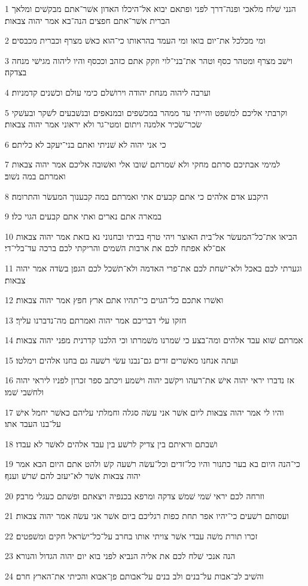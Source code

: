 \par 1 הנני שׁלח מלאכי ופנה־דרך לפני ופתאם יבוא אל־היכלו האדון אשׁר־אתם מבקשׁים ומלאך הברית אשׁר־אתם חפצים הנה־בא אמר יהוה צבאות׃
\par 2 ומי מכלכל את־יום בואו ומי העמד בהראותו כי־הוא כאשׁ מצרף וכברית מכבסים׃
\par 3 וישׁב מצרף ומטהר כסף וטהר את־בני־לוי וזקק אתם כזהב וככסף והיו ליהוה מגישׁי מנחה בצדקה׃
\par 4 וערבה ליהוה מנחת יהודה וירושׁלם כימי עולם וכשׁנים קדמניות׃
\par 5 וקרבתי אליכם למשׁפט והייתי עד ממהר במכשׁפים ובמנאפים ובנשׁבעים לשׁקר ובעשׁקי שׂכר־שׂכיר אלמנה ויתום ומטי־גר ולא יראוני אמר יהוה צבאות׃
\par 6 כי אני יהוה לא שׁניתי ואתם בני־יעקב לא כליתם׃
\par 7 למימי אבתיכם סרתם מחקי ולא שׁמרתם שׁובו אלי ואשׁובה אליכם אמר יהוה צבאות ואמרתם במה נשׁוב׃
\par 8 היקבע אדם אלהים כי אתם קבעים אתי ואמרתם במה קבענוך המעשׂר והתרומה׃
\par 9 במארה אתם נארים ואתי אתם קבעים הגוי כלו׃
\par 10 הביאו את־כל־המעשׂר אל־בית האוצר ויהי טרף בביתי ובחנוני נא בזאת אמר יהוה צבאות אם־לא אפתח לכם את ארבות השׁמים והריקתי לכם ברכה עד־בלי־די׃
\par 11 וגערתי לכם באכל ולא־ישׁחת לכם את־פרי האדמה ולא־תשׁכל לכם הגפן בשׂדה אמר יהוה צבאות׃
\par 12 ואשׁרו אתכם כל־הגוים כי־תהיו אתם ארץ חפץ אמר יהוה צבאות׃
\par 13 חזקו עלי דבריכם אמר יהוה ואמרתם מה־נדברנו עליך׃
\par 14 אמרתם שׁוא עבד אלהים ומה־בצע כי שׁמרנו משׁמרתו וכי הלכנו קדרנית מפני יהוה צבאות׃
\par 15 ועתה אנחנו מאשׁרים זדים גם־נבנו עשׂי רשׁעה גם בחנו אלהים וימלטו׃
\par 16 אז נדברו יראי יהוה אישׁ את־רעהו ויקשׁב יהוה וישׁמע ויכתב ספר זכרון לפניו ליראי יהוה ולחשׁבי שׁמו׃
\par 17 והיו לי אמר יהוה צבאות ליום אשׁר אני עשׂה סגלה וחמלתי עליהם כאשׁר יחמל אישׁ על־בנו העבד אתו׃
\par 18 ושׁבתם וראיתם בין צדיק לרשׁע בין עבד אלהים לאשׁר לא עבדו׃
\par 19 כי־הנה היום בא בער כתנור והיו כל־זדים וכל־עשׂה רשׁעה קשׁ ולהט אתם היום הבא אמר יהוה צבאות אשׁר לא־יעזב להם שׁרשׁ וענף׃
\par 20 וזרחה לכם יראי שׁמי שׁמשׁ צדקה ומרפא בכנפיה ויצאתם ופשׁתם כעגלי מרבק׃
\par 21 ועסותם רשׁעים כי־יהיו אפר תחת כפות רגליכם ביום אשׁר אני עשׂה אמר יהוה צבאות׃
\par 22 זכרו תורת משׁה עבדי אשׁר צויתי אותו בחרב על־כל־ישׂראל חקים ומשׁפטים׃
\par 23 הנה אנכי שׁלח לכם את אליה הנביא לפני בוא יום יהוה הגדול והנורא׃
\par 24 והשׁיב לב־אבות על־בנים ולב בנים על־אבותם פן־אבוא והכיתי את־הארץ חרם׃


